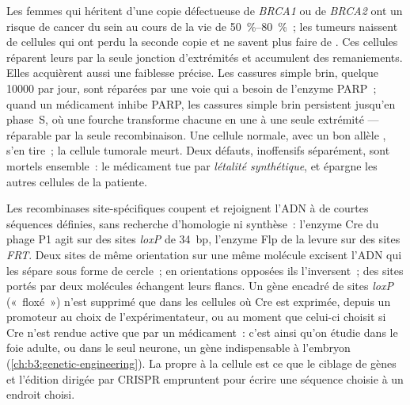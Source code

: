 \begin{example}\label{ex:b3:dna-repair:parp}
Les femmes qui héritent d'une copie défectueuse de \emph{BRCA1} ou de
\emph{BRCA2} ont un risque de cancer du sein au cours de la vie de
\qtyrange{50}{80}{\%}~; les tumeurs naissent de cellules qui ont perdu
la seconde copie et ne savent plus faire de .
Ces cellules réparent leurs  par la seule jonction
d'extrémités et accumulent des remaniements. Elles acquièrent aussi une
faiblesse précise. Les cassures simple brin, quelque \num{10000} par
jour, sont réparées par une voie qui a besoin de l'enzyme PARP~; quand
un médicament inhibe PARP, les cassures simple brin persistent jusqu'en
phase~S, où une fourche transforme chacune en une  à
une seule extrémité --- réparable par la seule recombinaison. Une
cellule normale, avec un bon allèle \emph{}, s'en tire~; la cellule
tumorale meurt. Deux défauts, inoffensifs séparément, sont mortels
ensemble~: le médicament tue par \emph{létalité synthétique}, et
épargne les autres cellules de la patiente.
\end{example}

\begin{proposition}\label{prop:b3:dna-repair:tools}
Les recombinases site-spécifiques coupent et rejoignent l'ADN à de
courtes séquences définies, sans recherche d'homologie ni synthèse~:
l'enzyme Cre du phage P1 agit sur des sites \emph{loxP} de
\qty{34}{bp}, l'enzyme Flp de la levure sur des sites \emph{FRT}. Deux
sites de même orientation sur une même molécule excisent l'ADN qui les
sépare sous forme de cercle~; en orientations opposées ils l'inversent~;
des sites portés par deux molécules échangent leurs flancs. Un gène
encadré de sites \emph{loxP} («~floxé~») n'est supprimé que dans les
cellules où Cre est exprimée, depuis un promoteur au choix de
l'expérimentateur, ou au moment que celui-ci choisit si Cre n'est
rendue active que par un médicament~: c'est ainsi qu'on étudie dans le
foie adulte, ou dans le seul neurone, un gène indispensable à l'embryon
(\cref{ch:b3:genetic-engineering}). La  propre à
la cellule est ce que le ciblage de gènes et l'édition dirigée par
CRISPR empruntent pour écrire une séquence choisie à un endroit choisi.
\end{proposition}

